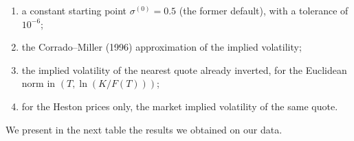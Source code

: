 \documentclass[11pt,a4paper]{article}
\theoremstyle{plain}
\theoremstyle{definition}
\begin{document}
\begin{enumerate}
    \item a constant starting point $\sigma^{(0)}=0.5$ (the former default), with a tolerance of $10^{-6}$;
    \item the Corrado--Miller (1996) approximation of the implied volatility;
    \item the implied volatility of the nearest quote already inverted, for the Euclidean norm in $(T,\ln(K/F(T)))$;
    \item for the Heston prices only, the market implied volatility of the same quote.
\end{enumerate}

We present in the next table the results we obtained on our data.


\begin{table}[h]
\centering
\small
{}
\caption{Starting point $\sigma^{(0)}$ of the Newton--Raphson inversion of the Black formula, on the 142 OTM quotes
of the CAC40 (12 February 2025). One Newton iteration costs one Black price and one vega. The nearest neighbour is the
closest quote already inverted for the Euclidean norm in $(T, \ln(K/F(T)))$, the quotes being inverted by increasing
expiry then strike; it lies in the same expiry for 91\% of the quotes. All the starting points converge to the same
volatilities, with no failure and no fallback to Brent's method.}
\label{tab:iv_solver}
\end{table}
\end{document}
